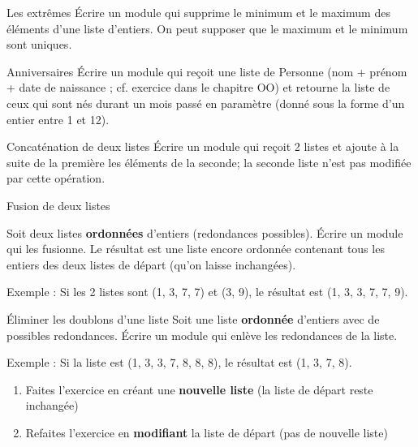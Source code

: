 \begin{Exercice}{Les extrêmes}
		Écrire un module qui supprime le minimum et le maximum des éléments
		d’une liste d’entiers. On peut supposer que le maximum et le minimum
		sont uniques.
\end{Exercice}

\begin{Exercice}{Anniversaires}
		Écrire un module qui reçoit une liste de Personne (nom + prénom + date
		de naissance ; cf. exercice dans le chapitre OO) et retourne la liste
		de ceux qui sont nés durant un mois passé en paramètre (donné sous la 
		forme d'un entier entre 1	et 12).
\end{Exercice}
	
\begin{Exercice}{Concaténation de deux listes}
		Écrire un module qui reçoit 2 listes et ajoute
		à la suite de la première les éléments de la seconde; la seconde liste
		n'est pas modifiée par cette opération.
\end{Exercice}

\begin{Exercice}{Fusion de deux listes}
	
		Soit deux listes \textbf{ordonnées}
		d'entiers (redondances possibles). Écrire un module
		qui les fusionne. Le résultat est une liste encore ordonnée contenant
		tous les entiers des deux listes de départ (qu'on
		laisse inchangées).

		Exemple : Si les 2 listes sont (1, 3, 7, 7) et (3, 9), 
		le résultat est (1, 3, 3, 7, 7, 9).
\end{Exercice}

\begin{Exercice}{Éliminer les doublons d'une liste}
		Soit une liste \textbf{ordonnée} 
		d'entiers avec de possibles redondances. Écrire un
		module qui enlève les redondances de la liste.
				
		Exemple : Si la liste est (1, 3, 3, 7, 8, 8, 8),
		le résultat est (1, 3, 7, 8).

		\begin{enumerate}[label=\alph*)]
			\item 
				Faites l'exercice en créant une \textbf{nouvelle
				liste} (la liste de départ reste inchangée)
			\item 
				Refaites l'exercice en \textbf{modifiant}
				la liste de départ (pas de nouvelle liste)
		\end{enumerate}
\end{Exercice}

